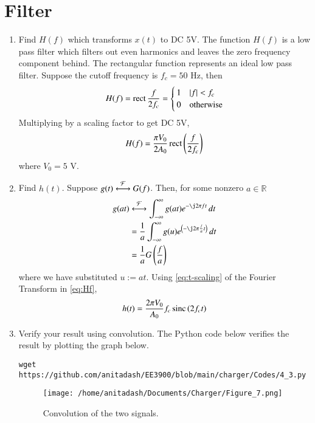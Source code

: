 \documentclass[journal,12pt,twocolumn]{IEEEtran}
\renewcommand\thesection{\arabic{section}}
\begin{document}
\section{Filter}
\begin{enumerate}[label=\thesection.\arabic*
,ref=\thesection.\theenumi]
\item Find $H(f)$ which transforms $x(t)$ to DC 5V.
\solution The function $H(f)$ is a low pass filter which filters out
even harmonics and leaves the zero frequency component behind.
The rectangular function represents an ideal low pass filter. 
Suppose the cutoff frequency is $f_c = 50$ Hz, then
\begin{align}
    H(f) = \mathop{\mathrm{rect}}{\frac{f}{2f_c}} =
    \begin{cases}
        1 & \left\vert f\right\vert < f_c \\
        0 & \textrm{otherwise}
    \end{cases}
    \label{eq:Hf}
\end{align}
Multiplying by a scaling factor to get DC 5V,
\begin{align}
    H(f) = \frac{\pi V_0}{2A_0}\mathop{\mathrm{rect}}{\left(\frac{f}{2f_c}\right)}
\end{align}
where $V_0 = 5$ V.
\item Find $h(t)$.
\solution Suppose $g(t)\overset{\mathcal{F}}{ \longleftrightarrow}G(f)$. Then, for some
nonzero $a \in \mathbb{R}$
\begin{align}
    g(at)&\system{F}\int_{-\infty}^{\infty}g(at)e^{-\j2\pi ft}\, dt \\
         &=\frac{1}{a}\int_{-\infty}^{\infty}g(u)e^{\brak{-\j2\pi \frac{f}{a}t}}\, dt \\
         &=\frac{1}{a}G\brak{\frac{f}{a}}
         \label{eq:t-scaling}
\end{align}
where we have substituted $u := at$. Using 
\eqref{eq:t-scaling} of the Fourier Transform in \eqref{eq:Hf},
\begin{align}
    h(t) = \frac{2\pi V_0}{A_0}f_c\mathop{\mathrm{sinc}}\left(2f_ct\right)
\end{align}
\item Verify your result using convolution.
\solution The Python code below verifies the result
by plotting the graph below.
\begin{lstlisting}
wget https://github.com/anitadash/EE3900/blob/main/charger/Codes/4_3.py
\end{lstlisting}
\begin{figure}[!ht]
    \texttt{[image: /home/anitadash/Documents/Charger/Figure\_7.png]}
    \caption{Convolution of the two signals.}
    \label{eq:fig-conv}
\end{figure}
\end{enumerate}
\end{document}
